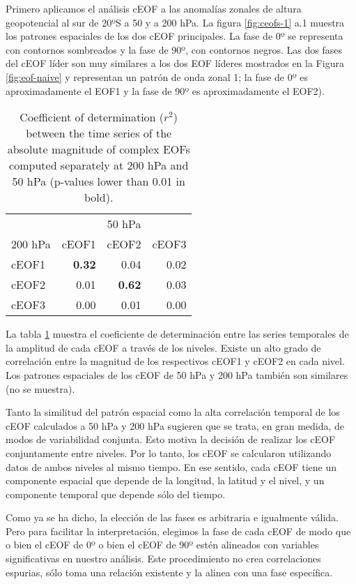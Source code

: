 \documentclass[12pt,oneside]{reedthesis}
\begin{document}
Primero aplicamos el análisis cEOF a las anomalías zonales de altura geopotencial al sur de 20ºS a 50 y a 200 hPa.
La figura \ref{fig:ceofs-1} a.1 muestra los patrones espaciales de los dos cEOF principales.
La fase de 0º se representa con contornos sombreados y la fase de 90º, con contornos negros.
Las dos fases del cEOF líder son muy similares a los dos EOF líderes mostrados en la Figura \ref{fig:eof-naive} y representan un patrón de onda zonal 1; la fase de 0º es aproximadamente el EOF1 y la fase de 90º es aproximadamente el EOF2).


\begin{table}

\caption{\label{tab:corr-ceof-splitted}Coefficient of determination (\(r^2\)) between the time series of the absolute magnitude of complex EOFs computed separately at 200 hPa and 50 hPa (p-values lower than 0.01 in bold).}
\centering
\begin{tabular}[t]{l>{}r>{}r>{}r}
\toprule
\multicolumn{1}{c}{} & \multicolumn{3}{c}{50 hPa} \\
\cmidrule(l{3pt}r{3pt}){2-4}
200 hPa & cEOF1 & cEOF2 & cEOF3\\
\midrule
cEOF1 & \textbf{0.32} & 0.04 & 0.02\\
cEOF2 & 0.01 & \textbf{0.62} & 0.03\\
cEOF3 & 0.00 & 0.01 & 0.00\\
\bottomrule
\end{tabular}
\end{table}
La tabla \ref{tab:corr-ceof-splitted} muestra el coeficiente de determinación entre las series temporales de la amplitud de cada cEOF a través de los niveles.
Existe un alto grado de correlación entre la magnitud de los respectivos cEOF1 y cEOF2 en cada nivel.
Los patrones espaciales de los cEOF de 50 hPa y 200 hPa también son similares (no se muestra).

Tanto la similitud del patrón espacial como la alta correlación temporal de los cEOF calculados a 50 hPa y 200 hPa sugieren que se trata, en gran medida, de modos de variabilidad conjunta.
Esto motiva la decisión de realizar los cEOF conjuntamente entre niveles.
Por lo tanto, los cEOF se calcularon utilizando datos de ambos niveles al mismo tiempo.
En ese sentido, cada cEOF tiene un componente espacial que depende de la longitud, la latitud y el nivel, y un componente temporal que depende sólo del tiempo.

Como ya se ha dicho, la elección de las fases es arbitraria e igualmente válida.
Pero para facilitar la interpretación, elegimos la fase de cada cEOF de modo que o bien el cEOF de 0º o bien el cEOF de 90º estén alineados con variables significativas en nuestro análisis.
Este procedimiento no crea correlaciones espurias, sólo toma una relación existente y la alinea con una fase específica.
\end{document}
